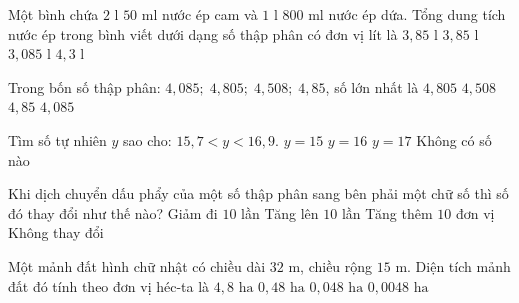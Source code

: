 \begin{ex} %
Một bình chứa $2\text{ l } 50\text{ ml}$ nước ép cam và $1\text{ l } 800\text{ ml}$ nước ép dứa. Tổng dung tích nước ép trong bình viết dưới dạng số thập phân có đơn vị lít là
\choice
{$3{,}85\text{ l}$}
{\True $3{,}85\text{ l}$}
{$3{,}085\text{ l}$}
{$4{,}3\text{ l}$}
\end{ex}

\begin{ex} %
Trong bốn số thập phân: $4{,}085;\; 4{,}805;\; 4{,}508;\; 4{,}85$, số lớn nhất là
\choice
{$4{,}805$}
{$4{,}508$}
{\True $4{,}85$}
{$4{,}085$}
\end{ex}

\begin{ex} %
Tìm số tự nhiên $y$ sao cho: $15{,}7 < y < 16{,}9$.
\choice
{$y = 15$}
{\True $y = 16$}
{$y = 17$}
{Không có số nào}
\end{ex}

\begin{ex} %
Khi dịch chuyển dấu phẩy của một số thập phân sang bên phải một chữ số thì số đó thay đổi như thế nào?
\choice
{Giảm đi $10$ lần}
{\True Tăng lên $10$ lần}
{Tăng thêm $10$ đơn vị}
{Không thay đổi}
\end{ex}

\begin{ex} %
Một mảnh đất hình chữ nhật có chiều dài $32\text{ m}$, chiều rộng $15\text{ m}$. Diện tích mảnh đất đó tính theo đơn vị héc-ta là
\choice
{$4{,}8\text{ ha}$}
{$0{,}48\text{ ha}$}
{\True $0{,}048\text{ ha}$}
{$0{,}0048\text{ ha}$}
\end{ex}

